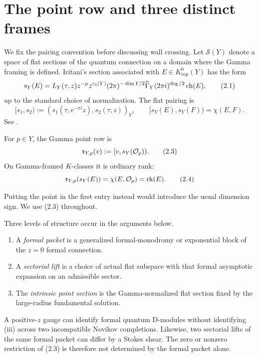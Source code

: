 \section{The point row and three distinct frames}\label{sec:point-row}

We fix the pairing convention before discussing wall crossing.  Let
\(\mathcal S(Y)\) denote a space of flat sections of the quantum connection on
a domain where the Gamma framing is defined.  Iritani's section associated
with \(E\in K^0_{\mathrm{top}}(Y)\) has the form
\[
 s_Y(E)=L_Y(\tau,z)z^{-\mu}z^{c_1(Y)}
 (2\pi)^{-\dim Y/2}\widehat{\Gamma}_Y(2\pi i)^{\deg/2}\operatorname{ch}(E),
                                                               \tag{2.1}
\]
up to the standard choice of normalization.  The flat pairing is
\[
 [s_1,s_2):=(s_1(\tau,e^{-\pi i}z),s_2(\tau,z))_Y,
 \qquad [s_Y(E),s_Y(F))=\chi(E,F).                  \tag{2.2}
\]
See \cite[Section~1]{IritaniGamma}.

\begin{definition}\label{def:point-row}
For \(p\in Y\), the Gamma point row is
\[
 \mathfrak r_{Y,p}(v):=[v,s_Y(\mathcal O_p)).                       \tag{2.3}
\]
On Gamma-framed \(K\)-classes it is ordinary rank:
\[
 \mathfrak r_{Y,p}(s_Y(E))=\chi(E,\mathcal O_p)=\operatorname{rk}(E).             \tag{2.4}
\]
\end{definition}

Putting the point in the first entry instead would introduce the usual
dimension sign.  We use (2.3) throughout.

Three levels of structure occur in the arguments below.
\begin{enumerate}[label=\textup{(\roman*)}]
\item A \emph{formal packet} is a generalized formal-monodromy or
  exponential block of the \(z=0\) formal connection.
\item A \emph{sectorial lift} is a choice of actual flat subspace with that
  formal asymptotic expansion on an admissible sector.
\item The \emph{intrinsic point section} is the Gamma-normalized flat
  section fixed by the large-radius fundamental solution.
\end{enumerate}

A positive-\(z\) gauge can identify formal quantum D-modules without
identifying (iii) across two incompatible Novikov completions.  Likewise,
two sectorial lifts of the same formal packet can differ by a Stokes shear.
The zero or nonzero restriction of (2.3) is therefore not determined by the
formal packet alone.

